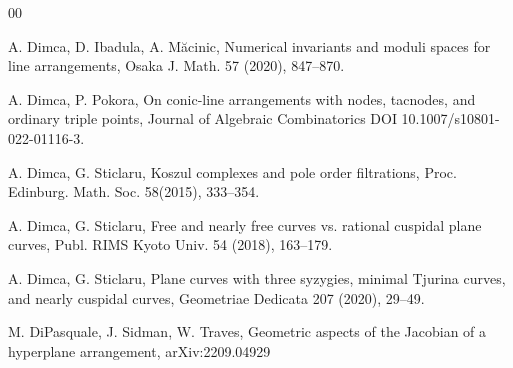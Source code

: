 \documentclass[12pt]{amsart}
\theoremstyle{plain}
\theoremstyle{definition}
\numberwithin{equation}{section}
\newcommand{\C}{\mathbb{C}}
\begin{document}
\begin{thebibliography}{00}

 A. Dimca, D. Ibadula, A. M\u acinic, Numerical invariants and moduli spaces for line arrangements, Osaka J. Math. 57 (2020), 847--870.




 A. Dimca, P. Pokora, On conic-line arrangements with nodes, tacnodes, and ordinary triple points, Journal of Algebraic Combinatorics
DOI 10.1007/s10801-022-01116-3.



 A. Dimca, G. Sticlaru, Koszul complexes and pole order filtrations, Proc. Edinburg. Math. Soc. 58(2015), 333--354.






 A. Dimca, G. Sticlaru, Free and nearly free curves vs. rational cuspidal plane curves, Publ. RIMS Kyoto Univ. 54 (2018), 163--179.


 A. Dimca, G. Sticlaru, Plane curves with three syzygies, minimal Tjurina curves, and nearly cuspidal curves, Geometriae Dedicata 207 (2020), 29--49.

 M. DiPasquale, J. Sidman, W. Traves, Geometric aspects of the Jacobian of a hyperplane arrangement,
arXiv:2209.04929 

 




\end{thebibliography}
\end{document}
